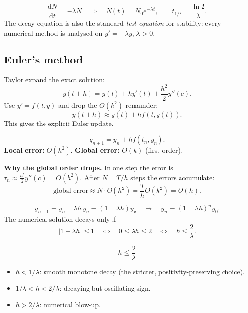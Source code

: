 \documentclass[10.5pt,a4paper]{article}
\newcommand{\dd}{\mathrm{d}}
\begin{document}
\begin{keybox}
\[
\frac{\dd N}{\dd t}=-\lambda N
\quad\Longrightarrow\quad
N(t)=N_0e^{-\lambda t},
\qquad
t_{1/2}=\frac{\ln 2}{\lambda}.
\]
The decay equation is also the standard \emph{test equation} for
stability: every numerical method is analysed on \(y'=-\lambda y\),
\(\lambda>0\).
\end{keybox}

\subsection{Euler's method}

\begin{derivbox}
Taylor expand the exact solution:
\[
y(t+h)=y(t)+h y'(t)+\frac{h^2}{2}y''(c).
\]
Use \(y'=f(t,y)\) and drop the \(O(h^2)\) remainder:
\[
y(t+h)\approx y(t)+h f(t,y(t)).
\]
This gives the explicit Euler update.
\end{derivbox}

\begin{keybox}
\[
y_{n+1}=y_n+h f(t_n,y_n).
\]
\textbf{Local error:} \(O(h^2)\).\quad
\textbf{Global error:} \(O(h)\) (first order).
\end{keybox}

\textbf{Why the global order drops.} In one step the error is
\(\tau_n\approx \frac{h^2}{2}y''(c)=O(h^2)\). After \(N=T/h\) steps the
errors accumulate:
\[
\text{global error}\approx N\cdot O(h^2)
=\frac{T}{h}O(h^2)=O(h).
\]

\begin{derivbox}[Stability on \(y'=-\lambda y\)]
\[
y_{n+1}=y_n-\lambda h\,y_n=(1-\lambda h)y_n
\quad\Longrightarrow\quad
y_n=(1-\lambda h)^n y_0.
\]
The numerical solution decays only if
\[
|1-\lambda h|\le1
\quad\Longleftrightarrow\quad
0\le \lambda h\le2
\quad\Longleftrightarrow\quad
h\le\frac{2}{\lambda}.
\]
\end{derivbox}

\begin{keybox}
\[
\boxed{\;h\le\frac{2}{\lambda}\;}
\]
\begin{itemize}
\item \(h<1/\lambda\): smooth monotone decay (the stricter, positivity-preserving choice).
\item \(1/\lambda<h<2/\lambda\): decaying but oscillating sign.
\item \(h>2/\lambda\): numerical blow-up.
\end{itemize}
\end{keybox}
\end{document}
